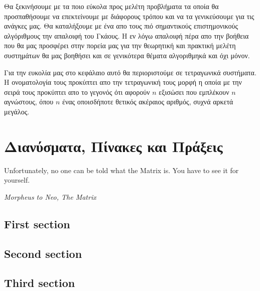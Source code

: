 \documentclass{tstextbook}
\begin{document}
\begin{summary}
 Θα ξεκινήσουμε με τα ποιο εύκολα προς μελέτη προβλήματα τα οποία θα προσπαθήσουμε να επεκτείνουμε με διάφορους τρόπου και να τα γενικεύσουμε για τις ανάγκες μας. Θα καταλήξουμε με ένα απο τους πιό σημαντικούς επιστημονικούς αλγόριθμους την απαλοιφή του Γκάους. Η εν λόγω απαλοιφή πέρα απο την βοήθεια που θα μας προσφέρει στην πορεία μας για την θεωρητική και πρακτική μελέτη συστημάτων θα μας βοηθήσει και σε γενικότερα θέματα αλγοριθμηκά και όχι μόνον.
 
 Για την ευκολία μας στο κεφάλαιο αυτό θα περιοριστούμε σε τετραγωνικά συστήματα. Η ονοματολογία τους προκύπτει απο την τετραγωνική τους μορφή η οποία με την σειρά τους προκύπτει απο το γεγονός ότι αφορούν $n$ εξισώσει που εμπλέκουν $n$ αγνώστους, όπου $n$ ένας οποισδήποτε θετικός ακέραιος αριθμός, συχνά αρκετά μεγάλος.
\end{summary}





\chapter{Διανύσματα, Πίνακες και Πράξεις}

\epigraph{Unfortunately, no one can be told what the Matrix is. You have to see it for yourself.}{\textit{Morpheus to Neo, The Matrix}}

\begin{summary}
  \blindtext
\end{summary}

\section{First section}
\Blindtext

\section{Second section}
\Blindtext

\section{Third section}
\Blindtext




\printindex
\end{document}
